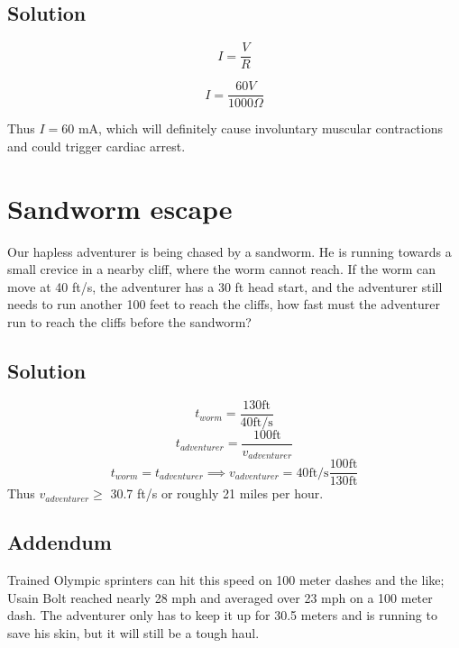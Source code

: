 \documentclass[12pt,letterpaper]{article}
\begin{document}
\subsection{Solution}

\[I = \frac{V}{R} \]

\[I = \frac{60 V}{1000 \Omega}\]

Thus $I = 60$ mA, which will definitely cause involuntary muscular contractions and could trigger cardiac arrest.

\section{Sandworm escape}

Our hapless adventurer is being chased by a sandworm. He is running towards a small crevice in a nearby cliff, where the worm cannot reach. If the worm can move at 40 ft/s, the adventurer has a 30 ft head start, and the adventurer still needs to run another 100 feet to reach the cliffs, how fast must the adventurer run to reach the cliffs before the sandworm?

\subsection{Solution}
\[t_{worm} = \frac{130 \textrm{ft}}{40 \textrm{ft/s}}\]
\[t_{adventurer} = \frac{100 \textrm{ft}}{v_{adventurer}}\]
\[t_{worm} = t_{adventurer} \implies v_{adventurer} = 40 \textrm{ft/s} \frac{100 \textrm{ft}}{130 \textrm{ft}} \]
Thus $v_{adventurer} \geq$ 30.7 ft/s or roughly 21 miles per hour.

\subsection{Addendum}
Trained Olympic sprinters can hit this speed on 100 meter dashes and the like;
Usain Bolt reached nearly 28 mph and averaged over 23 mph on a 100 meter dash.
The adventurer only has to keep it up for 30.5 meters and is running to save his skin, but it will still be a tough haul.
\end{document}
